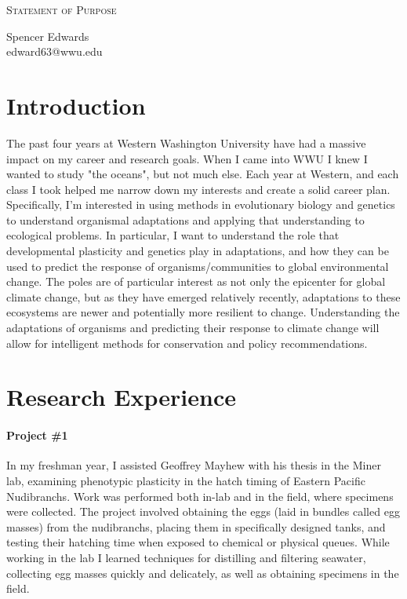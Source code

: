 \documentclass[letterpaper]{article}
\makeatletter
\newcommand{\soptitle}{Statement of Purpose}
\newcommand{\yourname}{Spencer Edwards}
\newcommand{\youremail}{edward63@wwu.edu}
\newcommand{\amper}{{\fontspec[Scale=.95]{Adobe Caslon Pro}\selectfont\itshape\&~{}}}
\makeatother
\begin{document}
\begin{center}{\huge \scshape \soptitle}\end{center}
\begin{center}\vspace{0.2em} {\Large \yourname\\}
  {\youremail}\end{center}

\section*{Introduction}
The past four years at Western Washington University have had a massive impact on my career and research goals. When I came into WWU I knew I wanted to study "the oceans", but not much else. Each year at Western, and each class I took helped me narrow down my interests and create a solid career plan. Specifically, I'm interested in using methods in evolutionary biology and genetics to understand organismal adaptations and applying that understanding to ecological problems. In particular, I want to understand the role that developmental plasticity and genetics play in adaptations, and how they can be used to predict the response of organisms/communities to global environmental change. The poles are of particular interest as not only the epicenter for global climate change, but as they have emerged relatively recently, adaptations to these ecosystems are newer and potentially more resilient to change. Understanding the adaptations of organisms and predicting their response to climate change will allow for intelligent methods for conservation and policy recommendations.

\section*{Research Experience}
\paragraph{Project \#1}
In my freshman year, I assisted Geoffrey Mayhew with his thesis in the Miner lab, examining phenotypic plasticity in the hatch timing of Eastern Pacific Nudibranchs. Work was performed both in-lab and in the field, where specimens were collected. 
The project involved obtaining the eggs (laid in bundles called egg masses) from the nudibranchs, placing them in specifically designed tanks, and testing their hatching time when exposed to chemical or physical queues. While working in the lab I learned techniques for distilling and filtering seawater, collecting egg masses quickly and delicately, as well as obtaining specimens in the field.
\end{document}
